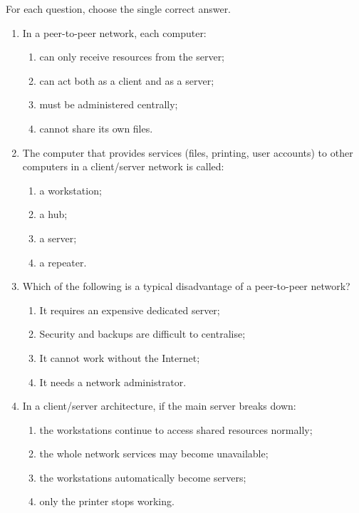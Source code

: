 \documentclass[11pt]{article}
\begin{document}
\begin{exercice}
For each question, choose the single correct answer.
\begin{enumerate}
\item In a peer-to-peer network, each computer:
\begin{enumerate}
\item can only receive resources from the server;
\item can act both as a client and as a server;
\item must be administered centrally;
\item cannot share its own files.
\end{enumerate}
\item The computer that provides services (files, printing, user accounts) to other computers in a client/server network is called:
\begin{enumerate}
\item a workstation;
\item a hub;
\item a server;
\item a repeater.
\end{enumerate}
\item Which of the following is a typical disadvantage of a peer-to-peer network?
\begin{enumerate}
\item It requires an expensive dedicated server;
\item Security and backups are difficult to centralise;
\item It cannot work without the Internet;
\item It needs a network administrator.
\end{enumerate}
\item In a client/server architecture, if the main server breaks down:
\begin{enumerate}
\item the workstations continue to access shared resources normally;
\item the whole network services may become unavailable;
\item the workstations automatically become servers;
\item only the printer stops working.
\end{enumerate}
\end{enumerate}
\end{exercice}
\end{document}
